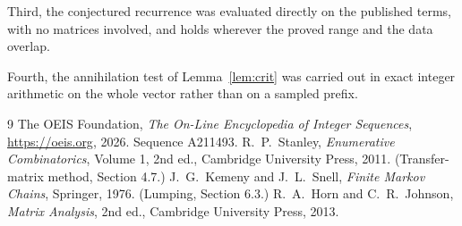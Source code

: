 \documentclass[11pt,a4paper]{article}
\theoremstyle{plain}
\theoremstyle{definition}
\begin{document}
Third, the conjectured recurrence was evaluated directly on the published terms, with no
matrices involved, and holds wherever the proved range and the data overlap.

Fourth, the annihilation test of Lemma~\ref{lem:crit} was carried out in exact integer
arithmetic on the whole vector rather than on a sampled prefix.

\begin{thebibliography}{9}
 The OEIS Foundation, \emph{The On-Line Encyclopedia of Integer
Sequences}, \url{https://oeis.org}, 2026. Sequence A211493.
 R.~P.~Stanley, \emph{Enumerative Combinatorics}, Volume 1, 2nd ed.,
Cambridge University Press, 2011. (Transfer-matrix method, Section 4.7.)
 J.~G.~Kemeny and J.~L.~Snell, \emph{Finite Markov Chains}, Springer, 1976.
(Lumping, Section 6.3.)
 R.~A.~Horn and C.~R.~Johnson, \emph{Matrix Analysis}, 2nd ed., Cambridge
University Press, 2013.
\end{thebibliography}
\end{document}
